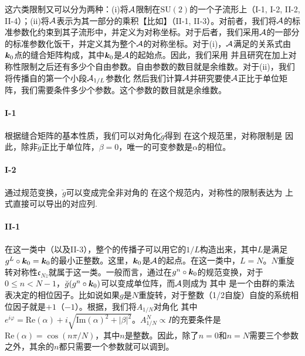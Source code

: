 这六类限制又可以分为两种：(i)将${\cal A}$限制在$\text{SU}(2)$的一个子流形上（I-1, I-2, II-2, II-4）；(ii)将${\cal A}$表示为其一部分的乘积【比如】（II-1, II-3）。对前者，我们将${\cal A}$的标准参数化约束到其子流形中，并定义为对称坐标。对于后者，我们采用${\cal A}$的一部分的标准参数化饭干，并定义其为整个${\cal A}$的对称坐标。对于(i)，${\cal A}$满足的关系式由$\boldsymbol{k}_0$点的缝合矩阵构成，其中$\boldsymbol{k}_0$是${\cal A}$的起始点。因此，我们采用
并且研究在加上对称性限制之后还有多少个自由参数。自由参数的数目就是余维数。对于(ii)，我们将传播自的第一个小段${\cal A}_{1/L}$参数化
然后我们计算${\cal A}$并研究要使${\cal A}$正比于单位矩阵，我们需要条件多少个参数。这个参数的数目就是余维数。

\paragraph*{I-1} 根据缝合矩阵的基本性质，我们可以对角化$\breve{g}$得到
在这个规范里，对称限制是
因此，除非$\breve{g}$正比于单位阵，$\beta=0$，唯一的可变参数是$\alpha$的相位。

\paragraph*{I-2} 通过规范变换，$\breve{g}$可以变成完全非对角的
在这个规范内，对称性的限制表达为
上式直接可以导出的对应列.

\paragraph*{II-1} 在这一类中（以及II-3），整个的传播子可以用它的$1/L$构造出来，其中$L$是满足$g^L\circ \boldsymbol{k}_0=\boldsymbol{k}_0$的最小正整数。这里，$\boldsymbol{k}_0$是${\cal A}$的起点。在这一类中，$L=N$。$N$重旋转对称性$\mathfrak{c}_{Nz}$就属于这一类。一般而言，通过在$g^n\circ \boldsymbol{k}_0$的规范变换，对于$0 \le n < N-1$，$\breve{g}(g^n\circ \boldsymbol{k}_0)$可以变成单位阵，而${\cal A}$则成为
其中
是一个由群的乘法表决定的相位因子。比如说如果$g$是$N$重旋转，对于整数（1/2自旋）自旋的系统相位因子就是$+1$（$-1$）。根据，我们将$A_{1/N}$对角化 
其中$e^{i\varphi}=\text{Re}(\alpha)+i\sqrt{\text{Im}(\alpha)^2+|\beta|^2}$。$A_{1/N}^N \propto I$的充要条件是$\text{Re}(\alpha)=\cos(n\pi/N)$，其中$n$是整数。因此，除了$n=0$和$n=N$需要三个参数之外，其余的$n$都只需要一个参数就可以调到。

